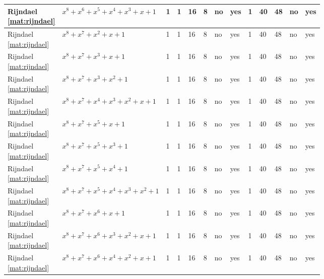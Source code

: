 \begin{tiny}
\begin{longtable}{|l|l|l|l|l|l|l|l|l|l|l|l|l|}
\shortstack{Rijndael \\ \eqref{mat:rijndael}} & $x^8 + x^6 + x^5 + x^4 + x^3 + x + 1$ & 1 & 1 & 16 & 8 & no & yes & 1 & 40 & 48 & no & yes \\ \hline
\shortstack{Rijndael \\ \eqref{mat:rijndael}} & $x^8 + x^7 + x^2 + x + 1$ & 1 & 1 & 16 & 8 & no & yes & 1 & 40 & 48 & no & yes \\ \hline
\shortstack{Rijndael \\ \eqref{mat:rijndael}} & $x^8 + x^7 + x^3 + x + 1$ & 1 & 1 & 16 & 8 & no & yes & 1 & 40 & 48 & no & yes \\ \hline
\shortstack{Rijndael \\ \eqref{mat:rijndael}} & $x^8 + x^7 + x^3 + x^2 + 1$ & 1 & 1 & 16 & 8 & no & yes & 1 & 40 & 48 & no & yes \\ \hline
\shortstack{Rijndael \\ \eqref{mat:rijndael}} & $x^8 + x^7 + x^4 + x^3 + x^2 + x + 1$ & 1 & 1 & 16 & 8 & no & yes & 1 & 40 & 48 & no & yes \\ \hline
\shortstack{Rijndael \\ \eqref{mat:rijndael}} & $x^8 + x^7 + x^5 + x + 1$ & 1 & 1 & 16 & 8 & no & yes & 1 & 40 & 48 & no & yes \\ \hline
\shortstack{Rijndael \\ \eqref{mat:rijndael}} & $x^8 + x^7 + x^5 + x^3 + 1$ & 1 & 1 & 16 & 8 & no & yes & 1 & 40 & 48 & no & yes \\ \hline
\shortstack{Rijndael \\ \eqref{mat:rijndael}} & $x^8 + x^7 + x^5 + x^4 + 1$ & 1 & 1 & 16 & 8 & no & yes & 1 & 40 & 48 & no & yes \\ \hline
\shortstack{Rijndael \\ \eqref{mat:rijndael}} & $x^8 + x^7 + x^5 + x^4 + x^3 + x^2 + 1$ & 1 & 1 & 16 & 8 & no & yes & 1 & 40 & 48 & no & yes \\ \hline
\shortstack{Rijndael \\ \eqref{mat:rijndael}} & $x^8 + x^7 + x^6 + x + 1$ & 1 & 1 & 16 & 8 & no & yes & 1 & 40 & 48 & no & yes \\ \hline
\shortstack{Rijndael \\ \eqref{mat:rijndael}} & $x^8 + x^7 + x^6 + x^3 + x^2 + x + 1$ & 1 & 1 & 16 & 8 & no & yes & 1 & 40 & 48 & no & yes \\ \hline
\shortstack{Rijndael \\ \eqref{mat:rijndael}} & $x^8 + x^7 + x^6 + x^4 + x^2 + x + 1$ & 1 & 1 & 16 & 8 & no & yes & 1 & 40 & 48 & no & yes \\ \hline

\end{longtable}
\end{tiny}
